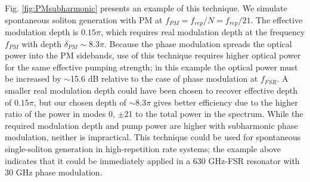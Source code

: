 Fig. \ref{fig:PMsubharmonic} presents an example of this technique. We simulate spontaneous soliton generation with PM at $f_{PM}=f_{rep}/N=f_{rep}/21$. The effective modulation depth is $0.15\pi$, which requires real modulation depth at the frequency $f_{PM}$ with depth $\delta_{PM}\sim8.3\pi$.  Because the phase modulation spreads the optical power into the PM sidebands, use of this technique requires higher optical power for the same effective pumping strength; in this example the optical power must be increased by $\sim$15.6 dB relative to the case of phase modulation at $f_{FSR}$. A smaller real modulation depth could have been chosen to recover effective depth of $0.15\pi$, but our chosen depth of $\sim8.3\pi$ gives better efficiency due to the higher ratio of the power in modes $0$, $\pm$21 to the total power in the spectrum. While the required modulation depth and pump power are higher with subharmonic phase modulation, neither is impractical. This technique could be used for spontaneous single-soliton generation in high-repetition rate systems; the example above indicates that it could be immediately applied in a 630 GHz-FSR resonator with 30 GHz phase modulation. 





